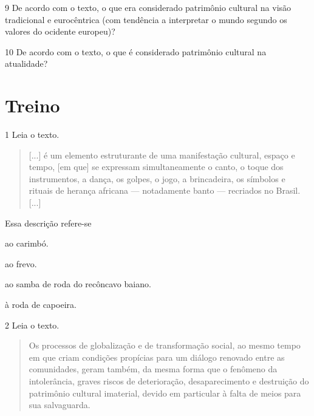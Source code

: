 \num{9} De acordo com o texto, o que era considerado patrimônio cultural na
  visão tradicional e eurocêntrica (com tendência a interpretar o mundo
  segundo os valores do ocidente europeu)?


\num{10} De acordo com o texto, o que é considerado patrimônio cultural na
  atualidade?


\section{Treino}

\num{1} Leia o texto.

\begin{quote}
{[}...{]} é um elemento estruturante de uma manifestação cultural, espaço e tempo, 
[em que] se expressam simultaneamente o canto, o toque dos instrumentos, a dança, 
os golpes, o jogo, a brincadeira, os símbolos e rituais de herança africana 
--- notadamente banto --- recriados no Brasil. {[}...{]}

\end{quote}
  
Essa descrição refere-se

\begin{escolha}
\item ao carimbó.
\item ao frevo.
\item ao samba de roda do recôncavo baiano.
\item à roda de capoeira.
\end{escolha}

\num{2} Leia o texto.

\begin{quote}
Os processos de globalização e de transformação social, ao mesmo tempo
em que criam condições propícias para um diálogo renovado entre as
comunidades, geram também, da mesma forma que o fenômeno da
intolerância, graves riscos de deterioração, desaparecimento e
destruição do patrimônio cultural imaterial, devido em particular à
falta de meios para sua salvaguarda.

\end{quote}

